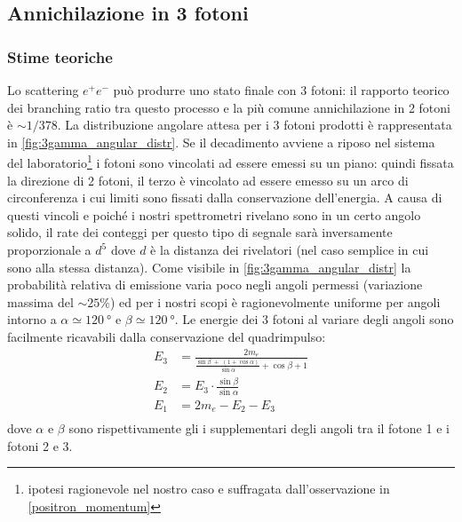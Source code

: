 \subsection{Annichilazione in 3 fotoni}

\subsubsection{Stime teoriche}
Lo scattering $e^+e^-$ può produrre uno stato finale con 3 fotoni: il rapporto teorico dei branching ratio tra questo processo e la più comune annichilazione in 2 fotoni è $\sim 1/378$\cite{3gamma}. La distribuzione angolare attesa per i 3 fotoni prodotti è rappresentata in \autoref{fig:3gamma_angular_distr}. Se il decadimento avviene a riposo nel sistema del laboratorio\footnote{ipotesi ragionevole nel nostro caso e suffragata dall'osservazione in \autoref{positron_momentum}} i fotoni sono vincolati ad essere emessi su un piano: quindi fissata la direzione di 2 fotoni, il terzo è vincolato ad essere emesso su un arco di circonferenza i cui limiti sono fissati dalla conservazione dell'energia. A causa di questi vincoli e poiché i nostri spettrometri rivelano sono in un certo angolo solido, il rate dei conteggi per questo tipo di segnale sarà inversamente proporzionale a $d^5$ dove $d$ è la distanza dei rivelatori (nel caso semplice in cui sono alla stessa distanza).
Come visibile in \autoref{fig:3gamma_angular_distr} la probabilità relativa di emissione varia poco negli angoli permessi (variazione massima del $\sim 25\%$) ed per i nostri scopi è ragionevolmente uniforme per angoli intorno a $\alpha\simeq \SI{120}{\degree}$ e $\beta\simeq\SI{120}{\degree}$.
Le energie dei 3 fotoni al variare degli angoli sono facilmente ricavabili dalla conservazione del quadrimpulso:
\begin{align*}
\label{eq:3gamma_energy}
E_3 &= \frac{2 m_e}{\frac{\sin\beta \;+\;(1+\cos\alpha)}{\sin\alpha}+\cos\beta+1}\\
E_2 &= E_3 \cdot \frac{\sin\beta}{\sin\alpha}\\
E_1 &= 2m_e - E_2 - E_3\\
\end{align*}
dove $\alpha$ e $\beta$ sono rispettivamente gli i supplementari degli angoli tra il fotone 1 e i fotoni 2 e 3.


